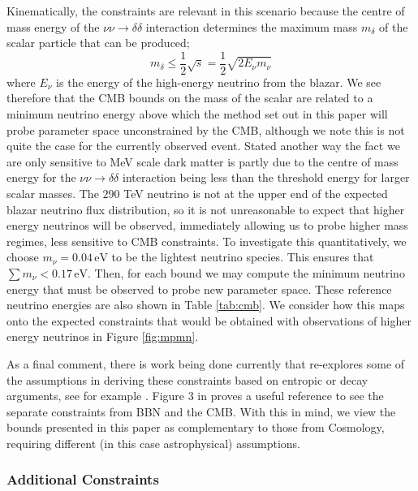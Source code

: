Kinematically, the constraints are relevant in this scenario because the centre of mass energy of the $\nu\nu \rightarrow \delta\delta$ interaction determines the maximum mass $m_\delta$ of the scalar particle that can be produced;
\begin{equation}
    m_\delta \leq \frac{1}{2}\sqrt{s} = \frac{1}{2}\sqrt{2 E_\nu m_\nu}
\end{equation}
where $E_\nu$ is the energy of the high-energy neutrino from the blazar. We see therefore that the CMB bounds on the mass of the scalar are related to a minimum neutrino energy above which the method set out in this paper will probe parameter space unconstrained by the CMB, although we note this is not quite the case for the currently observed event. Stated another way the fact we are only sensitive to MeV scale dark matter is partly due to the centre of mass energy for the $\nu\nu \rightarrow \delta\delta$ interaction being less than the threshold energy for larger scalar masses.  The $290$ TeV neutrino is not at the upper end of the expected blazar neutrino flux distribution, so it is not unreasonable to expect that higher energy neutrinos will be observed, immediately allowing us to probe higher mass regimes, less sensitive to CMB constraints. To investigate this quantitatively, we choose $m_\nu = 0.04\,\mathrm{eV}$ to be the lightest neutrino species. This ensures that $\sum{m_\nu} < 0.17 \, \mathrm{eV}$. Then, for each bound we may compute the minimum neutrino energy that must be observed to probe new parameter space. These reference neutrino energies are also shown in Table \ref{tab:cmb}. We consider how this maps onto the expected constraints that would be obtained with observations of higher energy neutrinos in Figure \ref{fig:mpmn}.

As a final comment, there is work being done currently that re-explores some of the assumptions in deriving these constraints based on entropic or decay arguments, see for example \cite{Kreisch}. Figure 3 in \cite{Wilkinson} proves a useful reference to see the separate constraints from BBN and the CMB. With this in mind, we view the bounds presented in this paper as complementary to those from Cosmology, requiring different (in this case astrophysical) assumptions.

\subsubsection{Additional Constraints}



